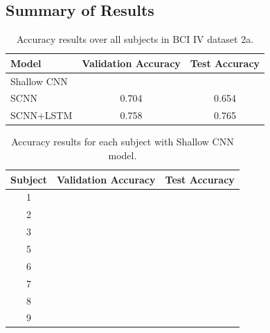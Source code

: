 \documentclass{article}
\begin{document}
\subsection{Summary of Results}
\begin{table}[H]
\begin{center}
    \begin{tabular}{|l|c|c|}
        \hline
        Model           & Validation Accuracy & Test Accuracy   \\
        \hline\hline
        Shallow CNN     &                     &                 \\
        SCNN            & 0.704               & 0.654           \\
        SCNN+LSTM       & 0.758               & 0.765           \\
        \hline
    \end{tabular}
\end{center}
\caption{Accuracy results over all subjects in BCI IV dataset 2a.}
\label{tab:acc}
\end{table}

\begin{table}[H]
\begin{center}
    \begin{tabular}{|c|c|c|}
        \hline
        Subject & Validation Accuracy   & Test Accuracy \\
        \hline\hline
        1       &   &   \\
        2       &   &   \\
        3       &   &   \\
        5       &   &   \\
        6       &   &   \\
        7       &   &   \\
        8       &   &   \\
        9       &   &   \\
        \hline
    \end{tabular}
\end{center}
\caption{Accuracy results for each subject with Shallow CNN model.}
\label{tab:subj}
\end{table}
\end{document}
